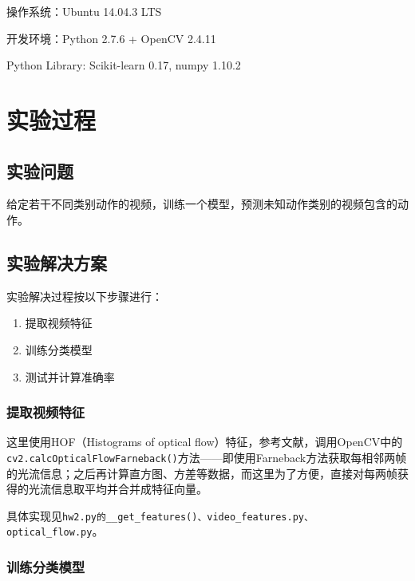 \documentclass[a4paper, 12pt, UTF8]{article}
\begin{document}
操作系统：Ubuntu 14.04.3 LTS

开发环境：Python 2.7.6 + OpenCV 2.4.11

Python Library: Scikit-learn 0.17, numpy 1.10.2


\section{实验过程}

\subsection{实验问题}

给定若干不同类别动作的视频，训练一个模型，预测未知动作类别的视频包含的动作。


\subsection{实验解决方案}

实验解决过程按以下步骤进行：

\begin{enumerate}

\item 提取视频特征

\item 训练分类模型

\item 测试并计算准确率

\end{enumerate}

\subsubsection{提取视频特征}

这里使用HOF（Histograms of optical flow）特征，参考文献\cite{ref1}，调用OpenCV中的\lstinline[language=Python]{cv2.calcOpticalFlowFarneback()}方法\textsuperscript{\cite{ref2}}——即使用Farneback方法获取每相邻两帧的光流信息；之后再计算直方图、方差等数据，而这里为了方便，直接对每两帧获得的光流信息取平均并合并成特征向量。

具体实现见\lstinline{hw2.py的__get_features()、video_features.py、optical_flow.py}。

\subsubsection{训练分类模型}
\end{document}
